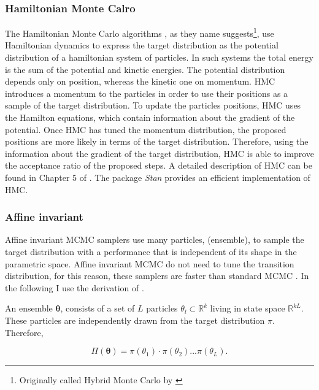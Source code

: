 \subsubsection{Hamiltonian Monte Calro}
The Hamiltonian Monte Carlo algorithms \citep{Duane1987,Neal1996}, as they name suggests\footnote{Originally called Hybrid Monte Carlo by \citep{Duane1987}}, use Hamiltonian dynamics to express the target distribution as the potential distribution of a hamiltonian system of particles. In such systems the total energy is the sum of the potential and kinetic energies. The potential distribution depends only on position, whereas the kinetic one on momentum. HMC introduces a momentum to the particles in order to use their positions as a sample of the target distribution. To update the particles positions, HMC uses the Hamilton equations, which contain information about the gradient of the potential. Once HMC has tuned the momentum distribution, the proposed positions are more likely in terms of the target distribution. Therefore, using the information about the gradient of the target distribution, HMC is able to improve the acceptance ratio of the proposed steps. A detailed description of HMC can be found in Chapter 5 of \citet{Brooks2011}. The package \emph{Stan} \citep{Stan} provides an efficient implementation of HMC.

\subsubsection{Affine invariant}
Affine invariant MCMC samplers use many particles, (ensemble), to sample the target distribution with a performance that is independent of its shape in the parametric space. Affine invariant MCMC do not need to tune the transition distribution, for this reason, these samplers are faster than standard MCMC \citep{Goodman2010}. In the following I use the derivation of \citet{Goodman2010}.


An ensemble $\boldsymbol{\theta}$, consists of a set of $L$ particles $\theta_l \subset \mathbb{R}^k$ living in state space $\mathbb{R}^{kL}$. These particles are independently drawn from the target distribution $\pi$. Therefore,

\begin{equation}
\Pi(\boldsymbol{\theta})=\pi(\theta_1)\cdot\pi(\theta_2)...\pi(\theta_L).\nonumber 
\end{equation}

